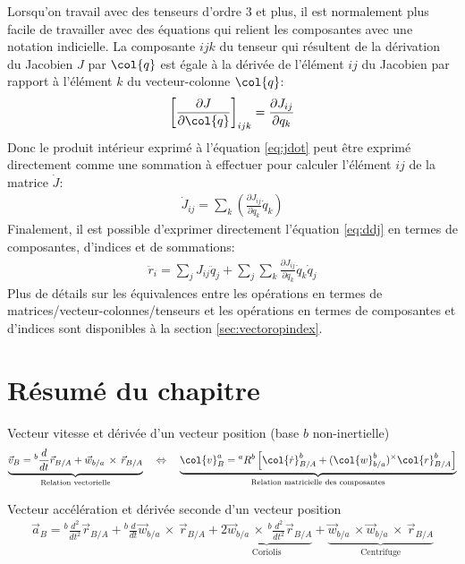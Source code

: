 Lorsqu'on travail avec des tenseurs d'ordre 3 et plus, il est normalement plus facile de travailler avec des équations qui relient les composantes avec une notation indicielle. La composante $ijk$ du tenseur qui résultent de la dérivation du Jacobien $J$ par $\col{q}$ est égale à la dérivée de l'élément $ij$ du Jacobien par rapport à l'élément $k$ du vecteur-colonne $\col{q}$:
\begin{align}
\left[\frac{ \partial J}{\partial \col{q}} \right]_{ijk} = \frac{ \partial J_{ij} }{\partial q_k } 
\end{align}
 Donc le produit intérieur exprimé à l'équation \eqref{eq:jdot} peut être exprimé directement comme une sommation à effectuer pour calculer l'élément $ij$ de la matrice $\dot{J}$:
\begin{align}
\dot{J}_{ij} = \sum_k \left( \frac{ \partial J_{ij} }{\partial q_k } \dot{q}_k \right)
\end{align}
Finalement, il est possible d'exprimer directement l'équation \eqref{eq:ddj} en termes de composantes, d'indices et de sommations:
\begin{align}
\ddot{r}_{i} =  
\sum_j J_{ij} \ddot{q}_j
+
\sum_j 
\sum_k  \frac{ \partial J_{ij} }{\partial q_k } \dot{q}_k 
\dot{q}_j
\end{align}
Plus de détails sur les équivalences entre les opérations en termes de matrices/vecteur-colonnes/tenseurs et les opérations en termes de composantes et d'indices sont disponibles à la section \ref{sec:vectoropindex}.




\newpage
\section{Résumé du chapitre}


Vecteur vitesse et dérivée d'un vecteur position (base $b$ non-inertielle)
\begin{align}
\underbrace{
\vec{v}_{B} = {}^{b}\frac{d}{dt} \vec{r}_{B/A} +  \vec{w}_{b/a} \, \times \, \vec{r}_{B/A}
}_{\text{Relation vectorielle}}
\quad \Leftrightarrow \quad 
\underbrace{
\col{v}_{B}^{a} = {}^{a}R^b \left[ \col{\dot{r}}^b_{B/A} +  (\col{w}_{b/a}^b)^{\times} \col{r}^b_{B/A}  \right] 
}_{\text{Relation matricielle des composantes}}
\end{align}

Vecteur accélération et dérivée seconde d'un vecteur position
\begin{align}
\vec{a}_{B} = 
{}^{b}\frac{d^2}{dt^2} \vec{r}_{B/A} 
+  
{}^{b}\frac{d}{dt} \vec{w}_{b/a} \, \times \, \vec{r}_{B/A}
+
\underbrace{
2 \vec{w}_{b/a} \, \times \, {}^{b}\frac{d^2}{dt^2} \vec{r}_{B/A}
}_{\text{Coriolis}}
+
\underbrace{
\vec{w}_{b/a} \, \times \vec{w}_{b/a} \, \times \,
\vec{r}_{B/A}
}_{\text{Centrifuge}}
\end{align}

